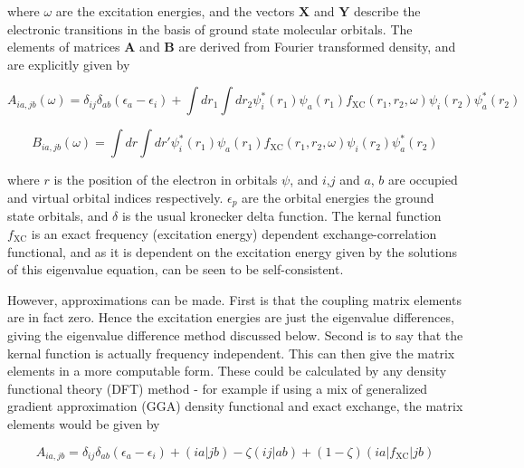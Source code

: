 where $\omega$ are the excitation energies, and the vectors $\mathbf{X}$ and $\mathbf{Y}$ 
describe the electronic transitions in the basis of ground state molecular orbitals. 
The elements of matrices $\mathbf{A}$ and $\mathbf{B}$ are derived from Fourier 
transformed density, and are explicitly given by

\begin{equation}
A_{ia,jb}\left(\omega\right) = \delta_{ij}\delta_{ab}\left(\epsilon_a - \epsilon_i\right) + \int dr_1 \int dr_2 \psi_i^*\left(r_1\right) \psi_a\left(r_1\right) f_{\text{XC}}\left(r_1, r_2, \omega\right) \psi_i\left(r_2\right) \psi_a^*\left(r_2\right)
\end{equation}

\begin{equation}
B_{ia,jb}\left(\omega\right) = \int dr \int dr' \psi_i^*\left(r_1\right) \psi_a\left(r_1\right) f_{\text{XC}}\left(r_1, r_2, \omega\right) \psi_i\left(r_2\right) \psi_a^*\left(r_2\right)
\end{equation}

where $r$ is the position of the electron in orbitals $\psi$, and $i$,$j$ and $a$, 
$b$ are occupied and virtual orbital indices respectively. $\epsilon_p$ are the 
orbital energies the ground state orbitals, and $\delta$ is the usual kronecker 
delta function. The kernal function $f_{\text{XC}}$ is an exact frequency (excitation energy) 
dependent exchange-correlation functional, and as it is dependent on the excitation 
energy given by the solutions of this eigenvalue equation, can be seen to be self-consistent.

However, approximations can be made. First is that the coupling matrix elements 
are in fact zero. Hence the excitation energies are just the eigenvalue differences, 
giving the eigenvalue difference method discussed below. Second is to say that the 
kernal function is actually frequency independent. This can then give the matrix 
elements in a more computable form. These could be calculated by any density functional 
theory (DFT) method - for example if using a mix of generalized gradient approximation 
(GGA) density functional and exact exchange, the matrix elements would be given 
by

\begin{equation}
A_{ia, jb} = \delta_{ij} \delta_{ab} \left(\epsilon_a - \epsilon_i \right) + \left(ia|jb\right) - \zeta\left(ij|ab\right) + \left(1-\zeta\right)\left(ia|f_{\text{XC}}|jb\right)
\end{equation}

